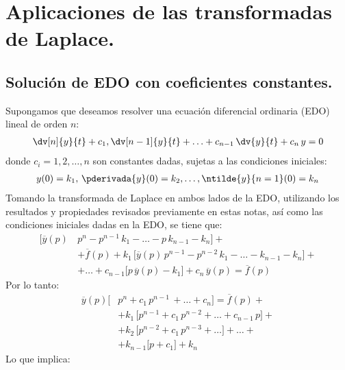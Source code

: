 \section{Aplicaciones de las transformadas de Laplace.}

\subsection{Solución de EDO con coeficientes constantes.}

Supongamos que deseamos resolver una ecuación diferencial ordinaria (EDO) lineal de orden $n$:
\begin{align}
\dv[n]{y}{t} + c_{1} , \dv[n-1]{y}{t} + \ldots + c_{n-1} \, \dv{y}{t} + c_{n} \, y = 0
\label{eq:ecuacion_04_54}
\end{align}
donde $c_{i} = 1, 2, \ldots, n$ son constantes dadas, sujetas a las condiciones iniciales:
\begin{align*}
y(0) = k_{1}, \, \pderivada{y}(0) = k_{2} , \ldots, \ntilde{y}{n=1}(0)= k_{n}
\end{align*}
Tomando la transformada de Laplace en ambos lados de la EDO, utilizando los resultados y propiedades revisados previamente en estas notas, así como las condiciones iniciales dadas en la EDO, se tiene que:
\begin{align*}
\big[ \overline{y}(p) \, &p^{n} - p^{n-1} \, k_{1} - \ldots - p \, k_{n-1} - k_{n}  \big] + \\[0.5em] &+ \overline{f}(p) + k_{1} \, \big[ \overline{y}(p) \, p^{n-1} - p^{n-2} \, k_{1} - \ldots - k_{n-1} - k_{n}  \big] + \\[0.5em]
&+ \ldots + c_{n-1} \big[ p \, \overline{y}(p) - k_{1}  \big] + c_{n} \, \overline{y}(p) = \overline{f}(p)
\end{align*}
Por lo tanto:
\begin{align*}
\overline{y}(p) \big[ &p^{n} + c_{1} \, p^{n-1} \, + \ldots + c_{n}  \big] = \overline{f}(p) + \\[0.5em]
&+ k_{1} \, \big[ p^{n-1} + c_{1} \, p^{n-2} + \ldots + c_{n-1} \, p \big] + \\[0.5em]
&+ k_{2} \, \big[ p^{n-2} + c_{1} \, p^{n-3} + \ldots  \big] +  \ldots + \\[0.5em]
&+ k_{n-1} \big[ p + c_{1}  \big] + k_{n}
\end{align*}
Lo que implica:
